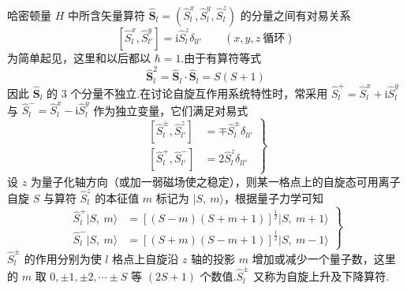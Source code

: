 哈密顿量 $H$ 中所含矢量算符 $\hat{\boldsymbol{S}}_l=\left(\hat{S}_l^{x},\hat{S}_l^{y},\hat{S}_l^{z}\right)$ 的分量之间有对易关系
\begin{equation}
  \left[\hat{S}_l^{x},\hat{S}_{l'}^{y}\right]=\mathrm{i}\hat{S}_l^{z}\delta_{ll'}\qquad
  \left(x,y,z\ \text{循环}\right)
\end{equation}
为简单起见，这里和以后都以 $\hbar=1$.由于有算符等式
\begin{equation}
  \hat{\boldsymbol{S}}_l^{2}=\hat{\boldsymbol{S}}_l\cdot\hat{\boldsymbol{S}}_l=S\left(S+1\right)
\end{equation}
因此 $\hat{\boldsymbol{S}}_l$ 的 3 个分量不独立.在讨论自旋互作用系统特性时，常采用
$\hat{S}_l^{+}=\hat{S}_l^{x}+\mathrm{i}\hat{S}_l^{y}$ 与 $\hat{S}_l^{-}=\hat{S}_l^{x}-\mathrm{i}\hat{S}_l^{y}$ 作为独立变量，它们满足对易式
\begin{equation}
  \left.\begin{aligned}
    \left[\hat{S}_l^{\pm},\hat{S}_{l'}^{z}\right]&=\mp\hat{S}_l^{\pm}\delta_{ll'}\\
    \left[\hat{S}_l^{+},\hat{S}_{l'}^{-}\right]&=2\hat{S}_l^{z}\delta_{ll'}
  \end{aligned}\right\}
\end{equation}
设 $z$ 为量子化轴方向（或加一弱磁场使之稳定），则某一格点上的自旋态可用离子自旋 $S$ 与算符
$\hat{S}_l^{z}$ 的本征值 $m$ 标记为 $|S,\ m\rangle$，根据量子力学可知
\begin{equation}
  \left.\begin{aligned}
    \hat{S}_l^{+}|S,\ m\rangle&=\left[(S-m)(S+m+1)\right]^{\frac{1}{2}}|S,\ m+1\rangle\\
    \hat{S}_l^{-}|S,\ m\rangle&=\left[(S+m)(S-m+1)\right]^{\frac{1}{2}}|S,\ m-1\rangle
  \end{aligned}\right\}
\end{equation}
$\hat{S}_l^{\pm}$ 的作用分别为使 $l$ 格点上自旋沿 $z$ 轴的投影 $m$ 增加或减少一个量子数，这里的 $m$ 取
$0,\pm1,\pm2,\cdots\pm S$ 等 $\left(2S+1\right)$ 个数值.$\hat{S}_l^{\pm}$ 又称为自旋上升及下降算符.

